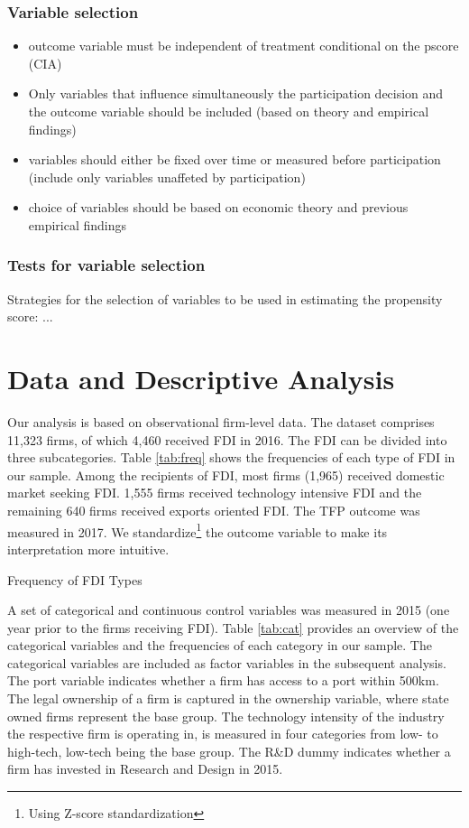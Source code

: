 \documentclass[a4paper,11pt]{scrartcl}
\begin{document}
\subsubsection*{Variable selection}
\begin{itemize}
\item outcome variable must be independent of treatment conditional on the pscore (CIA)
\item Only variables that influence simultaneously the participation decision and the outcome variable should be included (based on theory and empirical findings)
\item variables should either be fixed over time or measured before participation (include only variables unaffeted by participation)
\item choice of variables should be based on economic theory and previous empirical findings
\end{itemize}

\subsubsection*{Tests for variable selection}
Strategies for the selection of variables to be used in estimating the propensity score: ...


\section{Data and Descriptive Analysis}
Our analysis is based on observational firm-level data. The dataset comprises 11,323 firms, of which 4,460 received FDI in 2016. The FDI can be divided into three subcategories. Table \ref{tab:freq} shows the frequencies of each type of FDI in our sample. Among the recipients of FDI, most firms (1,965) received domestic market seeking FDI. 1,555 firms received technology intensive FDI and the remaining 640 firms received exports oriented FDI. The TFP outcome was measured in 2017. We standardize\footnote{Using Z-score standardization} the outcome variable to make its interpretation more intuitive.

\begin{table}[h]
	\centering
	\caption{Frequency of FDI Types} 
	
\label{tab:freq}
\end{table}

A set of categorical and continuous control variables was measured in 2015 (one year prior to the firms receiving FDI). Table \ref{tab:cat} provides an overview of the categorical variables and the frequencies of each category in our sample. The categorical variables are included as factor variables in the subsequent analysis. The port variable indicates whether a firm has access to a port within 500km. The legal ownership of a firm is captured in the ownership variable, where state owned firms represent the base group. The technology intensity of the industry the respective firm is operating in, is measured in four categories from low- to high-tech, low-tech being the base group. The R\&D dummy indicates whether a firm has invested in Research and Design in 2015. \\
\end{document}
